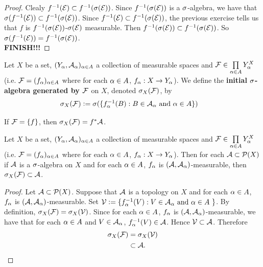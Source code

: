 \documentclass{book}
\begin{document}
	\begin{proof}
		Clealy $f^{-1}(\mathcal{E}) \subset f^{-1}(\sigma(\mathcal{E}))$. Since $f^{-1}(\sigma(\mathcal{E}))$ is a $\sigma$-algebra, we have that $\sigma(f^{-1}(\mathcal{E})) \subset f^{-1}(\sigma(\mathcal{E}))$. Since $f^{-1}(\mathcal{E}) \subset f^{-1}(\sigma(\mathcal{E}))$, the previous exercise tells us that $f$ is $f^{-1}(\sigma(\mathcal{E}))$-$\sigma(\mathcal{E})$ measurable. Then $f^{-1}(\sigma(\mathcal{E})) \subset f^{-1}(\sigma(\mathcal{E}))$. So $\sigma(f^{-1}(\mathcal{E})) = f^{-1}(\sigma(\mathcal{E}))$.  \\
		\textbf{FINISH!!!}
	\end{proof}
	
	\begin{defn} 
		Let $X$ be a set, $(Y_{\alpha}, \mathcal{A}_{\alpha})_{\alpha \in A}$ a collection of measurable spaces and $\mathcal{F} \in \prod \limits_{\alpha \in A}Y_{\alpha}^X$ (i.e. $\mathcal{F} = (f_{\alpha})_{\alpha \in A}$ where for each $\alpha \in A$, $f_{\alpha}:X \rightarrow Y_{\alpha}$). We define the \textbf{initial $\sigma$-algebra generated by $\mathcal{F}$} on $X$, denoted $\sigma_X(\mathcal{F})$, by 
		\begin{align*}
			\sigma_X(\mathcal{F}) 
			& \vcentcolon= \sigma(\{f_{\alpha}^{-1}(B): B \in \mathcal{A}_{\alpha} \text{ and } \alpha \in A \})
		\end{align*}	 
	\end{defn}
	
	\begin{note}
		If $\mathcal{F} = \{f\}$, then $\sigma_X(\mathcal{F}) = f^*\mathcal{A}$.
	\end{note}

	\begin{ex} 
		Let $X$ be a set, $(Y_{\alpha}, \mathcal{A}_{\alpha})_{\alpha \in A}$ a collection of measurable spaces and $\mathcal{F} \in \prod \limits_{\alpha \in A}Y_{\alpha}^X$ (i.e. $\mathcal{F} = (f_{\alpha})_{\alpha \in A}$ where for each $\alpha \in A$, $f_{\alpha}:X \rightarrow Y_{\alpha}$). Then for each $\mathcal{A} \subset \mathcal{P}(X)$ if $\mathcal{A}$ is a $\sigma$-algebra on $X$ and for each $\alpha \in A$, $f_{\alpha}$ is $(\mathcal{A}, \mathcal{A}_{\alpha})$-measurable, then $\sigma_X(\mathcal{F}) \subset \mathcal{A}$.
	\end{ex}
	
	\begin{proof}
		Let $\mathcal{A} \subset \mathcal{P}(X)$. Suppose that $\mathcal{A}$ is a topology on $X$ and for each $\alpha \in A$, $f_{\alpha}$ is $(\mathcal{A}, \mathcal{A}_{\alpha})$-measurable. Set $\mathcal{V} \vcentcolon= \{f_{\alpha}^{-1}(V): \text{$V \in \mathcal{A}_{\alpha}$ and $\alpha \in A$ }\}$. By definition, $\sigma_X(\mathcal{F}) = \sigma_X(\mathcal{V})$. Since for each $\alpha \in A$, $f_{\alpha}$ is $(\mathcal{A}, \mathcal{A}_{\alpha})$-measurable, we have that for each $\alpha \in A$ and $V \in \mathcal{A}_{\alpha}$, $f_{\alpha}^{-1}(V) \in \mathcal{A}$. Hence $\mathcal{V} \subset \mathcal{A}$. Therefore
		\begin{align*}
			\sigma_X(\mathcal{F})
			& = \sigma_X(\mathcal{V}) \\
			& \subset \mathcal{A}.
		\end{align*}
	\end{proof}
	
\end{document}
